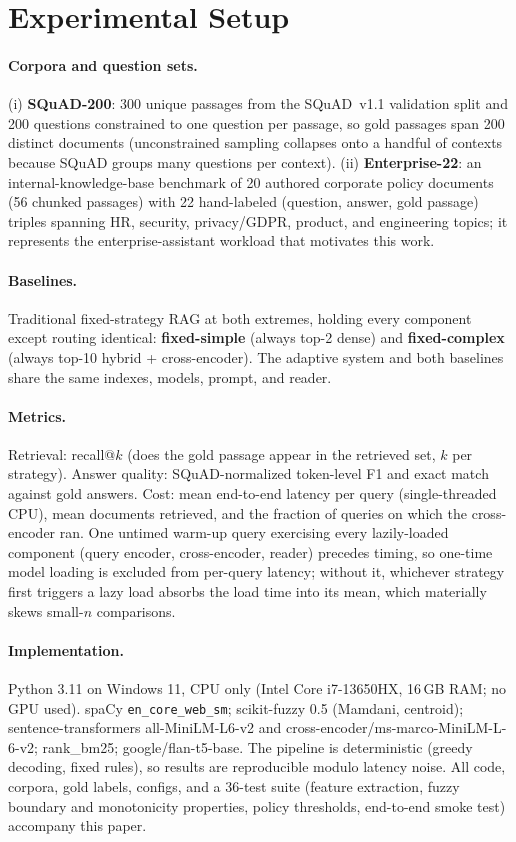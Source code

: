 \documentclass[11pt]{article}
\begin{document}
\section{Experimental Setup}
\label{sec:setup}

\paragraph{Corpora and question sets.}
(i) \textbf{SQuAD-200}: 300 unique passages from the SQuAD~v1.1 validation
split \citep{rajpurkar2016squad} and 200 questions constrained to one question
per passage, so gold passages span 200 distinct documents (unconstrained
sampling collapses onto a handful of contexts because SQuAD groups many
questions per context). (ii) \textbf{Enterprise-22}: an internal-knowledge-base
benchmark of 20 authored corporate policy documents (56 chunked passages) with
22 hand-labeled (question, answer, gold passage) triples spanning HR, security,
privacy/GDPR, product, and engineering topics; it represents the
enterprise-assistant workload that motivates this work.

\paragraph{Baselines.}
Traditional fixed-strategy RAG at both extremes, holding every component
except routing identical: \textbf{fixed-simple} (always top-2 dense) and
\textbf{fixed-complex} (always top-10 hybrid + cross-encoder). The adaptive
system and both baselines share the same indexes, models, prompt, and reader.

\paragraph{Metrics.}
Retrieval: recall@$k$ (does the gold passage appear in the retrieved set,
$k$ per strategy). Answer quality: SQuAD-normalized token-level F1 and exact
match against gold answers. Cost: mean end-to-end latency per query
(single-threaded CPU), mean documents retrieved, and the fraction of queries
on which the cross-encoder ran. One untimed warm-up query exercising every
lazily-loaded component (query encoder, cross-encoder, reader) precedes
timing, so one-time model loading is excluded from per-query latency; without
it, whichever strategy first triggers a lazy load absorbs the load time into
its mean, which materially skews small-$n$ comparisons.

\paragraph{Implementation.}
Python 3.11 on Windows 11, CPU only (Intel Core i7-13650HX, 16\,GB RAM; no
GPU used).
spaCy \texttt{en\_core\_web\_sm}; scikit-fuzzy 0.5 (Mamdani, centroid);
sentence-transformers all-MiniLM-L6-v2 and
cross-encoder/ms-marco-MiniLM-L-6-v2; rank\_bm25; google/flan-t5-base. The
pipeline is deterministic (greedy decoding, fixed rules), so results are
reproducible modulo latency noise. All code, corpora, gold labels, configs,
and a 36-test suite (feature extraction, fuzzy boundary and monotonicity
properties, policy thresholds, end-to-end smoke test) accompany this paper.
\end{document}
